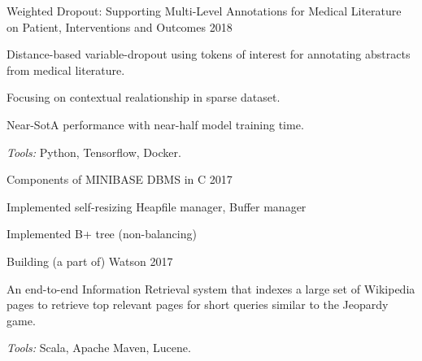 \begin{cventries}
\cventry
    {}
    {Weighted Dropout: Supporting Multi-Level Annotations for Medical Literature on Patient, Interventions and Outcomes} %
    {2018} %
    {}
    {
      \vspace{-3mm}
      \begin{cvitems} %
        \item {Distance-based variable-dropout using tokens of interest for annotating abstracts from medical literature.}
        \item {Focusing on contextual realationship in sparse dataset.}
        \item {Near-SotA performance with near-half model training time.}
        \item {\textit{Tools:} Python, Tensorflow, Docker.}
      \end{cvitems}
    }
    {}

  \cventry
    {}
    {Components of MINIBASE DBMS in C} %
    {2017} %
    {}
    {
      \vspace{-3mm}
      \begin{cvitems} %
        \item {Implemented self-resizing Heapfile manager, Buffer manager}
        \item {Implemented B+ tree (non-balancing)}
      \end{cvitems}
    }
    {}

  \cventry
    {}
    {Building (a part of) Watson} %
    {2017} %
    {}
    {
      \vspace{-3mm}
      \begin{cvitems} %
        \item {An end-to-end Information Retrieval system that indexes a large set of Wikipedia pages to retrieve top relevant pages for short queries similar to the Jeopardy game.}
        \item {\textit{Tools:} Scala, Apache Maven, Lucene.}
      \end{cvitems}
    }
    {}


\end{cventries}
